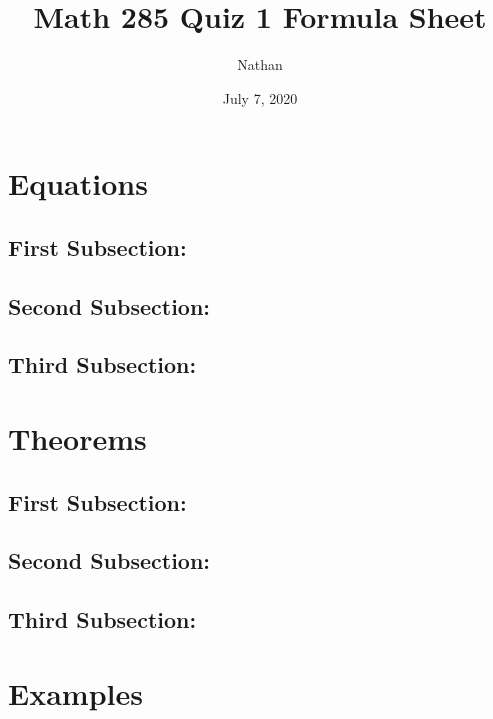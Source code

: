 \documentclass{article}
\title{Math 285 Quiz 1 Formula Sheet}
\author{Nathan}
\date{July 7, 2020}
\begin{document}
\maketitle

\section*{Equations}

\subsection*{First Subsection:}
\setcounter{equation}{0}



\subsection*{Second Subsection:}
\setcounter{equation}{0}



\subsection*{Third Subsection:}
\setcounter{equation}{0}





\section*{Theorems}

\subsection*{First Subsection:}
\setcounter{equation}{0}



\subsection*{Second Subsection:}
\setcounter{equation}{0}



\subsection*{Third Subsection:}
\setcounter{equation}{0}





\section*{Examples}
\end{document}
